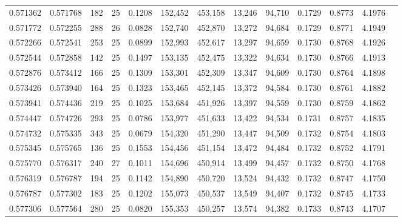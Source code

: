 \begin{tabular}{rrrrrrrrrrrrr}
0.571362 & 0.571768 &   182 &  25 &                                     0.1208 & 152,452 & 453,158 &  13,246 &  94,710 & 0.1729 & 0.8773 & 4.1976 \\
0.571772 & 0.572255 &   288 &  26 &                                     0.0828 & 152,740 & 452,870 &  13,272 &  94,684 & 0.1729 & 0.8771 & 4.1949 \\
0.572266 & 0.572541 &   253 &  25 &                                     0.0899 & 152,993 & 452,617 &  13,297 &  94,659 & 0.1730 & 0.8768 & 4.1926 \\
0.572544 & 0.572858 &   142 &  25 &                                     0.1497 & 153,135 & 452,475 &  13,322 &  94,634 & 0.1730 & 0.8766 & 4.1913 \\
0.572876 & 0.573412 &   166 &  25 &                                     0.1309 & 153,301 & 452,309 &  13,347 &  94,609 & 0.1730 & 0.8764 & 4.1898 \\
0.573426 & 0.573940 &   164 &  25 &                                     0.1323 & 153,465 & 452,145 &  13,372 &  94,584 & 0.1730 & 0.8761 & 4.1882 \\
0.573941 & 0.574436 &   219 &  25 &                                     0.1025 & 153,684 & 451,926 &  13,397 &  94,559 & 0.1730 & 0.8759 & 4.1862 \\
0.574447 & 0.574726 &   293 &  25 &                                     0.0786 & 153,977 & 451,633 &  13,422 &  94,534 & 0.1731 & 0.8757 & 4.1835 \\
0.574732 & 0.575335 &   343 &  25 &                                     0.0679 & 154,320 & 451,290 &  13,447 &  94,509 & 0.1732 & 0.8754 & 4.1803 \\
0.575345 & 0.575765 &   136 &  25 &                                     0.1553 & 154,456 & 451,154 &  13,472 &  94,484 & 0.1732 & 0.8752 & 4.1791 \\
0.575770 & 0.576317 &   240 &  27 &                                     0.1011 & 154,696 & 450,914 &  13,499 &  94,457 & 0.1732 & 0.8750 & 4.1768 \\
0.576319 & 0.576787 &   194 &  25 &                                     0.1142 & 154,890 & 450,720 &  13,524 &  94,432 & 0.1732 & 0.8747 & 4.1750 \\
0.576787 & 0.577302 &   183 &  25 &                                     0.1202 & 155,073 & 450,537 &  13,549 &  94,407 & 0.1732 & 0.8745 & 4.1733 \\
0.577306 & 0.577564 &   280 &  25 &                                     0.0820 & 155,353 & 450,257 &  13,574 &  94,382 & 0.1733 & 0.8743 & 4.1707 \\

\end{tabular}
